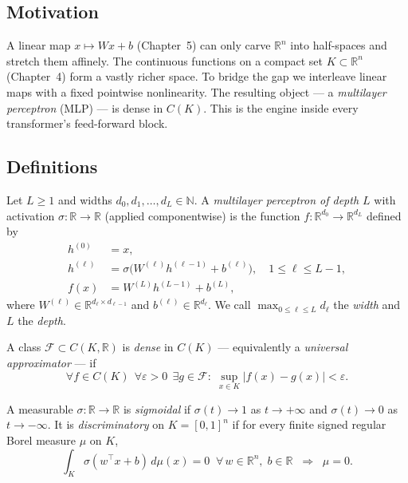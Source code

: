 \subsection*{Motivation}

A linear map $x \mapsto Wx + b$ (Chapter~5) can only carve $\mathbb{R}^n$ into half-spaces and stretch them affinely. The continuous functions on a compact set $K \subset \mathbb{R}^n$ (Chapter~4) form a vastly richer space. To bridge the gap we interleave linear maps with a fixed pointwise nonlinearity. The resulting object --- a \emph{multilayer perceptron} (MLP) --- is dense in $C(K)$. This is the engine inside every transformer's feed-forward block.

\subsection*{Definitions}

\begin{definition}
Let $L \geq 1$ and widths $d_0, d_1, \dots, d_L \in \mathbb{N}$. A \emph{multilayer perceptron of depth $L$} with activation $\sigma : \mathbb{R} \to \mathbb{R}$ (applied componentwise) is the function $f : \mathbb{R}^{d_0} \to \mathbb{R}^{d_L}$ defined by
\begin{align*}
h^{(0)} &= x, \\
h^{(\ell)} &= \sigma\!\big(W^{(\ell)} h^{(\ell-1)} + b^{(\ell)}\big), \quad 1 \leq \ell \leq L-1, \\
f(x) &= W^{(L)} h^{(L-1)} + b^{(L)},
\end{align*}
where $W^{(\ell)} \in \mathbb{R}^{d_\ell \times d_{\ell-1}}$ and $b^{(\ell)} \in \mathbb{R}^{d_\ell}$. We call $\max_{0 \leq \ell \leq L} d_\ell$ the \emph{width} and $L$ the \emph{depth}.
\end{definition}

\begin{definition}
A class $\mathcal{F} \subset C(K, \mathbb{R})$ is \emph{dense} in $C(K)$ --- equivalently a \emph{universal approximator} --- if
\[
\forall f \in C(K)\;\, \forall \varepsilon > 0\;\, \exists g \in \mathcal{F} : \;\sup_{x \in K} \lvert f(x) - g(x) \rvert < \varepsilon.
\]
\end{definition}

\begin{definition}
A measurable $\sigma : \mathbb{R} \to \mathbb{R}$ is \emph{sigmoidal} if $\sigma(t) \to 1$ as $t \to +\infty$ and $\sigma(t) \to 0$ as $t \to -\infty$. It is \emph{discriminatory} on $K = [0,1]^n$ if for every finite signed regular Borel measure $\mu$ on $K$,
\[
\int_K \sigma(w^\top x + b)\, d\mu(x) = 0 \;\;\forall\, w \in \mathbb{R}^n,\; b \in \mathbb{R} \;\;\Longrightarrow\;\; \mu = 0.
\]
\end{definition}

